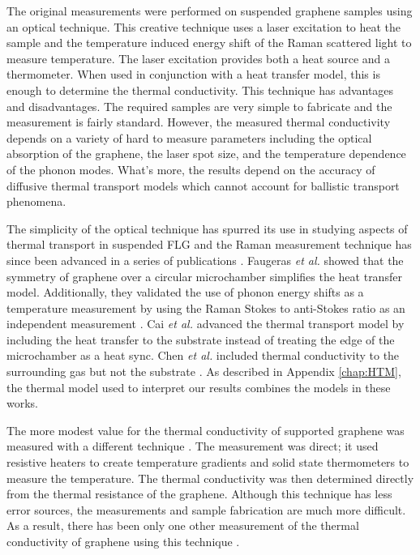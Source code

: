 The original measurements were performed on suspended graphene samples using an optical technique.
This creative technique uses a laser excitation to heat the sample and the temperature induced energy shift of the Raman scattered light to measure temperature.
The laser excitation provides both a heat source and a thermometer.
When used in conjunction with a heat transfer model, this is enough to determine the thermal conductivity.
This technique has advantages and disadvantages.
The required samples are very simple to fabricate and the measurement is fairly standard.
However, the measured thermal conductivity depends on a variety of hard to measure parameters including the optical absorption of the graphene, the laser spot size, and the temperature dependence of the phonon modes.
What's more, the results depend on the accuracy of diffusive thermal transport models which cannot account for ballistic transport phenomena.

The simplicity of the optical technique has spurred its use in studying aspects of thermal transport in suspended FLG and the Raman measurement technique has since been advanced in a series of publications \cite{Balandin2008,Faugeras2010,Cai2010,Ghosh2010,Lee2011,Chen2011a,Chen2012}.
Faugeras \textit{et al.} showed that the symmetry of graphene over a circular microchamber simplifies the heat transfer model.
Additionally, they validated the use of phonon energy shifts as a temperature measurement by using the Raman Stokes to anti-Stokes ratio as an independent measurement \cite{Faugeras2010}.
Cai \textit{et al.} advanced the thermal transport model by including the heat transfer to the substrate instead of treating the edge of the microchamber as a heat sync.
Chen \textit{et al.} included thermal conductivity to the surrounding gas but not the substrate \cite{Chen2011a}.
As described in Appendix \ref{chap:HTM}, the thermal model used to interpret our results combines the models in these works.

The more modest value for the thermal conductivity of supported graphene was measured with a different technique \cite{Seol2010}.
The measurement was direct; it used resistive heaters to create temperature gradients and solid state thermometers to measure the temperature.
The thermal conductivity was then determined directly from the thermal resistance of the graphene.
Although this technique has less error sources, the measurements and sample fabrication are much more difficult.
As a result, there has been only one other measurement of the thermal conductivity of graphene using this technique \cite{Jang2010}.

